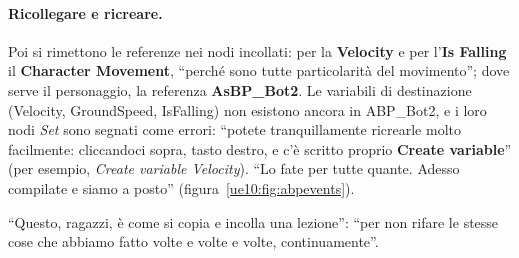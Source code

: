 \paragraph{Ricollegare e ricreare.} Poi si rimettono le referenze nei nodi incollati: per
la \textbf{Velocity} e per l'\textbf{Is Falling} il \textbf{Character Movement}, ``perché
sono tutte particolarità del movimento''; dove serve il personaggio, la referenza
\textbf{AsBP\_Bot2}. Le variabili di destinazione (Velocity, GroundSpeed, IsFalling) non
esistono ancora in ABP\_Bot2, e i loro nodi \emph{Set} sono segnati come errori: ``potete
tranquillamente ricrearle molto facilmente: cliccandoci sopra, tasto destro, e c'è
scritto proprio \textbf{Create variable}'' (per esempio, \emph{Create variable
Velocity}). ``Lo fate per tutte quante. Adesso compilate e siamo a posto''
(figura~\ref{ue10:fig:abpevents}).

``Questo, ragazzi, è come si copia e incolla una lezione'': ``per non rifare le stesse
cose che abbiamo fatto volte e volte e volte, continuamente''.

